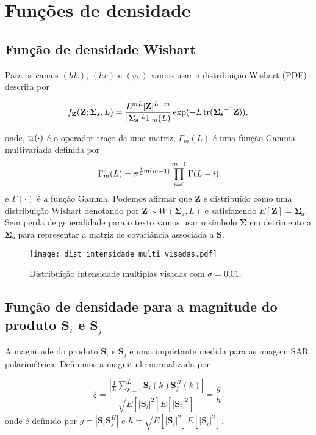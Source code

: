 \section{Funções de densidade}
\subsection{Função de densidade Wishart}
Para os canais $(hh)$, $(hv)$ e $(vv)$ vamos usar a distribuição Wishart (PDF) descrita por

\begin{equation}
    f_{\mathbf{Z}}(\mathbf{Z};\mathbf{\Sigma_{s}},L)=\frac{L^{mL}|\mathbf{Z}|^{L-m}}{|\mathbf{\Sigma_{s}}|^{L}\Gamma_m(L)} \exp(-L\operatorname{tr}(\mathbf{\Sigma_{s}}^{-1}\mathbf{Z})), \\
\end{equation} 

onde, $\operatorname{tr}(\cdot)$ é o operador traço de uma matriz, $\Gamma_m(L)$ é uma função Gamma multivariada definida por
\begin{equation}\label{cap_acf_10}
	\Gamma_m(L)=\pi^{\frac{1}{2}m(m-1)} \prod_{i=0}^{m-1}\Gamma(L-i) \\
\end{equation}
e $\Gamma(\cdot)$ é a função Gamma. Podemos afirmar que $\mathbf{Z}$ é distribuído como uma distribuição Wishart denotando por $\mathbf{Z}\sim W(\mathbf{\Sigma_{s}}, L)$ e satisfazendo $E[\mathbf{Z}]=\mathbf{\Sigma_{s}}$. Sem perda de generalidade para o texto vamos usar o simbolo $\mathbf{\Sigma}$ em detrimento a $\mathbf{\Sigma_{s}}$ para representar a matriz de covariância associada a $\mathbf{S}$.

\begin{figure}[hbt]
\centering
\texttt{[image: dist\_intensidade\_multi\_visadas.pdf]}
	\caption{Distribuição intensidade multiplas visadas com $\sigma=0.01$.}
\label{fig2}
\end{figure}


\subsection{Função de densidade para a magnitude do produto $\mathbf{S}_i$ e $\mathbf{S}_j$}
A magnitude do produto $\mathbf{S}_i$ e $\mathbf{S}_j$ é uma importante medida para as imagem SAR polarimétrica. Definimos a magnitude normalizada por 

\begin{equation}
	\xi = \frac{\left|\frac{1}{L} \sum_{k=1}^L\mathbf{S}_i(k)\mathbf{S}_j^H(k) \right|}{\sqrt{E[|\mathbf{S}_i|^2]E[|\mathbf{S}_i|^2]}}=\frac{g}{h}.
\end{equation}
onde é definido por $g=|\mathbf{S}_i\mathbf{S}_j^H|$ e $h=\sqrt{E[|\mathbf{S}_i|^2]E[|\mathbf{S}_i|^2]}$.

